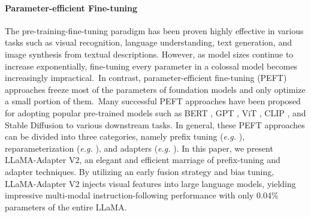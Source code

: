 \documentclass[10pt,twocolumn,letterpaper]{article}
\begin{document}
\paragraph{Parameter-efficient Fine-tuning~} The pre-training-fine-tuning paradigm has been proven highly effective in various tasks such as visual recognition, language understanding, text generation, and image synthesis from textual descriptions. However, as model sizes continue to increase exponentially, fine-tuning every parameter in a colossal model becomes increasingly impractical.~In contrast, parameter-efficient fine-tuning (PEFT) approaches \cite{peft,ding2022delta} freeze most of the parameters of foundation models and only optimize a small portion of them.~Many successful PEFT approaches \cite{sung2022vl,he2022towards,sung2022lst,gao2021making,jia2022visual,lester2021power,stable-diffusion-lora,zhang2022pointclip,zhang2023prompt} have been proposed for adopting popular pre-trained models such as BERT \cite{devlin2019bert}, GPT \cite{radford2018improving,radford2019language,brown2020language}, ViT \cite{dosovitskiy2021an}, CLIP \cite{radford2021learning}, and Stable Diffusion \cite{rombach2022high} to various downstream tasks. In general, these PEFT approaches can be divided into three categories, namely prefix tuning (\emph{e.g.} \cite{li2021prefix,zhou2022coop}), reparameterization (\emph{e.g.} \cite{hu2022lora,mahabadi2021compacter,stable-diffusion-lora}), and adapters (\emph{e.g.} \cite{houlsby2019parameter,gao2021clip,zhang2022tip}).
In this paper, we present LLaMA-Adapter V2, an elegant and efficient marriage of prefix-tuning and adapter techniques. By utilizing an early fusion strategy and bias tuning, LLaMA-Adapter V2 injects visual features into large language models, yielding impressive multi-modal instruction-following performance with only 0.04\% parameters of the entire LLaMA. 
\end{document}

